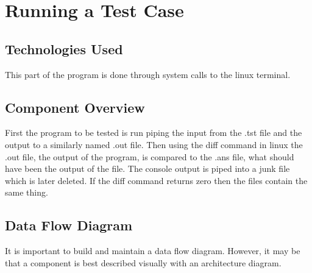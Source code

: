 \section{Running a Test Case }

\subsection{Technologies  Used}
This part of the program is done through system calls to the linux terminal. 

\subsection{Component  Overview}
First the program to be tested is run piping the input from the .tst file and the output to a similarly named .out file.
Then using the diff command in linux the .out file, the output of the program, is compared to the .ans file, what should
have been the output of the file.  The console output is piped into a junk file which is later deleted.  If the diff command
returns zero then the files contain the same thing.

\subsection{Data Flow Diagram}
It is important to build and maintain a data flow diagram.  However, it may be 
that a component is best described visually with an architecture diagram. 


